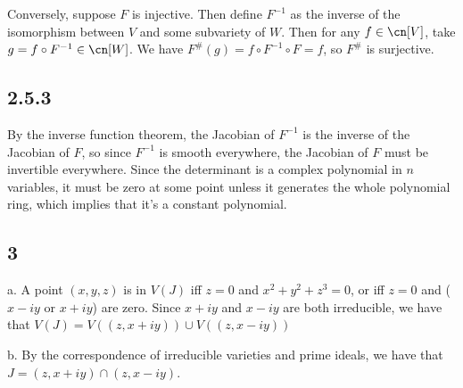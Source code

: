 \documentclass{article}
\begin{document}
Conversely, suppose $F$ is injective. Then define $F^{-1}$ as the inverse of the isomorphism between $V$ and some subvariety of $W$. Then for any $f\in\cn[V]$, take $g=f\circ F^{-1}\in\cn[W]$. We have $F^\#(g)=f\circ F^{-1}\circ F=f$, so $F^\#$ is surjective.
\subsection*{2.5.3}
By the inverse function theorem, the Jacobian of $F^{-1}$ is the inverse of the Jacobian of $F$, so since $F^{-1}$ is smooth everywhere, the Jacobian of $F$ must be invertible everywhere. Since the determinant is a complex polynomial in $n$ variables, it must be zero at some point unless it generates the whole polynomial ring, which implies that it's a constant polynomial.
\subsection*{3}
a. A point $(x,y,z)$ is in $V(J)$ iff $z=0$ and $x^2+y^2+z^3=0$, or iff $z=0$ and ($x-iy$ or $x+iy$) are zero. Since $x+iy$ and $x-iy$ are both irreducible, we have that $V(J)=V((z,x+iy))\cup V((z,x-iy))$

b. By the correspondence of irreducible varieties and prime ideals, we have that $J=(z,x+iy)\cap(z,x-iy)$.
\end{document}
